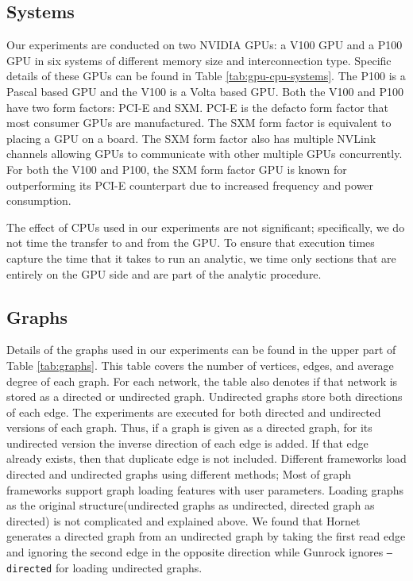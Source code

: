 \subsection{Systems}
Our experiments are conducted on two NVIDIA GPUs: a V100 GPU and a P100 GPU in six systems of different memory size and interconnection type. Specific details of these GPUs can be found in Table \ref{tab:gpu-cpu-systems}.
The P100 is a Pascal based GPU and the V100 is a Volta based GPU\@.
Both the V100 and P100 have two form factors: PCI-E and SXM\@. PCI-E is the defacto form factor that most consumer GPUs are manufactured. The SXM form factor is equivalent to placing a GPU on a board. The SXM form factor also has multiple NVLink channels allowing GPUs to communicate with other multiple GPUs concurrently. For both the V100 and P100, the SXM form factor GPU is known for outperforming its PCI-E counterpart due to increased frequency and power consumption.


The effect of CPUs used in our experiments are not significant; specifically, we do not time the transfer to and from the GPU\@. To ensure that execution times capture the time that it takes to run an analytic, we time only sections that are entirely on the GPU side and are part of the analytic procedure.


\subsection{Graphs}
Details of the graphs used in our experiments can be found in the upper part of Table \ref{tab:graphs}. This table covers the number of vertices, edges, and average degree of each graph. For each network, the table also denotes if that network is stored as a directed or undirected graph. Undirected graphs store both directions of each edge. The experiments are executed for both directed and undirected versions of each graph. Thus, if a graph is given as a directed graph, for its undirected version the inverse direction of each edge is added. If that edge already exists, then that duplicate edge is not included. Different frameworks load directed and undirected graphs using different methods; Most of graph frameworks support graph loading features with user parameters. Loading graphs as the original structure(undirected graphs as undirected, directed graph as directed) is not complicated and explained above. We found that Hornet generates a directed graph from an undirected graph by taking the first read edge and ignoring the second edge in the opposite direction while Gunrock ignores \texttt{--directed} for loading undirected graphs.



